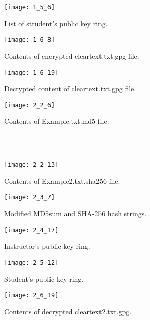 \documentclass[a4paper]{article}
\begin{document}
	\begin{figure}[ht]
		\centering
		\texttt{[image: 1\_5\_6]}
		\caption{List of strudent's public key ring.}
		\label{fig:1_5_6}
	\end{figure}

	\begin{figure}[ht]
		\centering
		\texttt{[image: 1\_6\_8]}
		\caption{Contents of encrypted cleartext.txt.gpg file.}
		\label{fig:1_6_8}
	\end{figure}

	\begin{figure}[ht]
		\centering
		\texttt{[image: 1\_6\_19]}
		\caption{Decrypted content of cleartext.txt.gpg file.}
		\label{fig:1_6_19}
	\end{figure}

	\begin{figure}[ht]
		\centering
		\texttt{[image: 2\_2\_6]}
		\caption{Contents of Example.txt.md5 file.}
		\label{fig:2_2_6}
	\end{figure}
	\\
	\pagebreak
	\\
	\begin{figure}[ht]
		\centering
		\texttt{[image: 2\_2\_13]}
		\caption{Contents of Example2.txt.sha256 file.}
		\label{fig:2_2_13}
	\end{figure}

	\begin{figure}[ht]
		\centering
		\texttt{[image: 2\_3\_7]}
		\caption{Modified MD5sum and SHA-256 hash strings.}
		\label{fig:2_3_7}
	\end{figure}
	
	\begin{figure}[ht]
		\centering
		\texttt{[image: 2\_4\_17]}
		\caption{Instructor's public key ring.}
		\label{fig:2_4_17}
	\end{figure}

	\begin{figure}[ht]
		\centering
		\texttt{[image: 2\_5\_12]}
		\caption{Student's public key ring.}
		\label{fig:2_5_12}
	\end{figure}

	\begin{figure}[ht]
		\centering
		\texttt{[image: 2\_6\_19]}
		\caption{Contents of decrypted cleartext2.txt.gpg.}
		\label{fig:2_6_19}
	\end{figure}
\end{document}
